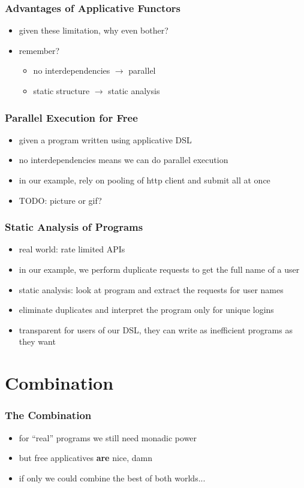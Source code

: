 \documentclass[compress]{beamer}
\begin{document}
\begin{frame}
  \frametitle{Advantages of Applicative Functors}
  \begin{itemize}
  \item given these limitation, why even bother?
  \item remember?
    \begin{itemize}
    \item no interdependencies $\rightarrow$ parallel
    \item static structure $\rightarrow$ static analysis
    \end{itemize}
  \end{itemize}
\end{frame}

\begin{frame}
  \frametitle{Parallel Execution for Free}
  \begin{itemize}
  \item given a program written using applicative DSL
  \item no interdependencies means we can do parallel execution
  \item in our example, rely on pooling of http client and submit all
    at once
  \item TODO: picture or gif?
  \end{itemize}
\end{frame}

\begin{frame}
  \frametitle{Static Analysis of Programs}
  \begin{itemize}
  \item real world: rate limited APIs
  \item in our example, we perform duplicate requests to get the full
    name of a user
  \item static analysis: look at program and extract the requests for
    user names
  \item eliminate duplicates and interpret the program only for unique
    logins
  \item transparent for users of our DSL, they can write as
    inefficient programs as they want
  \end{itemize}
\end{frame}

\section{Combination}

\begin{frame}
  \frametitle{The Combination}
  \begin{itemize}
  \item for ``real'' programs we still need monadic power
  \item but free applicatives \textbf{are} nice, damn
  \item if only we could combine the best of both worlds...
  \end{itemize}
\end{frame}
\end{document}
